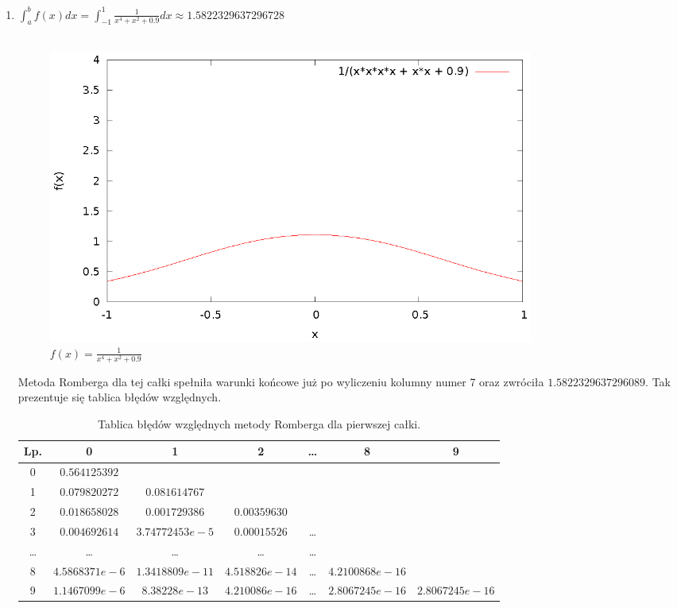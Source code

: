 \documentclass{article}
\begin{document}
\begin{enumerate}
	\item $\int_a^b f(x) dx = \int_{-1}^{1} \frac{1}{x^4 + x^2 + 0.9} dx \approx 1.5822329637296728$ \\ \\
	\begin{figure}[H]
		\centering
	    \includegraphics[width=0.8\textwidth]{wykresy/1.eps}
	    \caption{$f(x) = \frac{1}{x^4 + x^2 + 0.9}$}
	\end{figure}
	Metoda Romberga dla tej całki spełniła warunki końcowe już po wyliczeniu kolumny
	numer 7 oraz zwróciła $1.5822329637296089$.
	Tak prezentuje się tablica błędów względnych.

	\begin{table}[h]
	\centering
	\begin{tabular}[c]{|c|c|c|c|c|c|c|}
	\hline
	Lp. & 0 & 1 & 2 & \ldots & 8 & 9 \\
	\hline
	0 & $0.564125392$ &  &  &  &  & \\
	1 & $0.079820272$ & $0.081614767$ &  &  & & \\
	2 & $0.018658028$ & $0.001729386$ & $0.00359630$ & & & \\
	3 & $0.004692614$ & $3.74772453e-5$ & $0.00015526$	& \dots &  &  \\
	\dots & \dots & \dots & \dots & \dots & & \\
	8 & $4.5868371e-6$ & $1.3418809e-11$ & $4.518826e-14$ & \dots & $4.2100868e-16$ &  \\
	9 & $1.1467099e-6$ & $8.38228e-13$ & $4.210086e-16$ & \dots & $2.8067245e-16$ & $2.8067245e-16$ \\
	\hline
	\end{tabular}
	\caption{Tablica błędów względnych metody Romberga dla pierwszej całki.}
	\end{table}


\end{enumerate}
\end{document}
